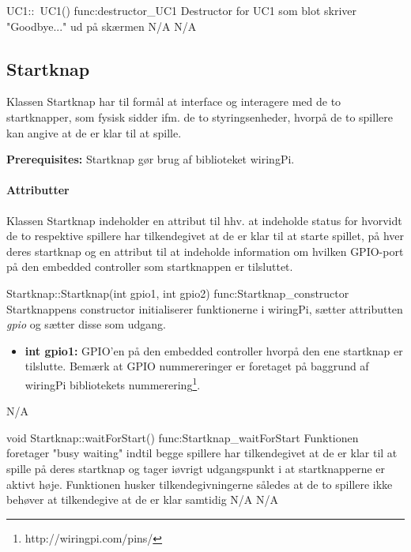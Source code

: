 \begin{functionDescription}
{UC1::~UC1()}
{func:destructor_UC1}
{Destructor for UC1 som blot skriver "Goodbye..." ud på skærmen}
{N/A}
{N/A}
\end{functionDescription}


\subsection{Startknap}
Klassen Startknap har til formål at interface og interagere med de to startknapper, som fysisk sidder ifm. de to styringsenheder, hvorpå de to spillere kan angive at de er klar til at spille. 

\textbf{Prerequisites:}
Startknap gør brug af biblioteket wiringPi\cite{2020Http://wiringpi.com/}.

\paragraph{Attributter}
Klassen Startknap indeholder en attribut til hhv. at indeholde status for hvorvidt de to respektive spillere har tilkendegivet at de er klar til at starte spillet, på hver deres startknap og en attribut til at indeholde information om hvilken GPIO-port på den embedded controller som startknappen er tilsluttet. 

\begin{functionDescription}
{Startknap::Startknap(int gpio1, int gpio2)}
{func:Startknap_constructor}
{Startknappens constructor initialiserer funktionerne i wiringPi\cite{2020Http://wiringpi.com/}, sætter attributten \textit{gpio} og sætter disse som udgang.
}
{\begin{itemize}
    \item \textbf{int gpio1:} GPIO'en på den embedded controller hvorpå den ene startknap er tilslutte. Bemærk at GPIO nummereringer er foretaget på baggrund af wiringPi bibliotekets nummerering\footnote{http://wiringpi.com/pins/}. 
\end{itemize}}
{N/A}
\end{functionDescription}

\begin{functionDescription}
{void Startknap::waitForStart()}
{func:Startknap_waitForStart}
{Funktionen foretager "busy waiting" indtil begge spillere har tilkendegivet at de er klar til at spille på deres startknap og tager iøvrigt udgangspunkt i at startknapperne er aktivt høje. Funktionen husker tilkendegivningerne således at de to spillere ikke behøver at tilkendegive at de er klar samtidig}
{N/A}
{N/A}
\end{functionDescription}

